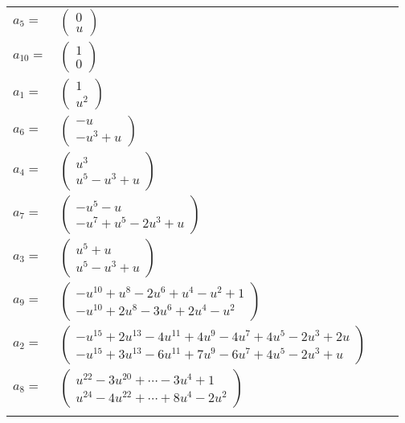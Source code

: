 \documentclass[1p]{elsarticle_modified}
\theoremstyle{definition}
\begin{document}
\begin{tabular}{m{7pt} m{180pt} m{7pt} m{180pt} }
\flushright $a_{5}=$&$\begin{pmatrix}0\\u\end{pmatrix}$ \\
\flushright $a_{10}=$&$\begin{pmatrix}1\\0\end{pmatrix}$ \\
\flushright $a_{1}=$&$\begin{pmatrix}1\\u^2\end{pmatrix}$ \\
\flushright $a_{6}=$&$\begin{pmatrix}- u\\- u^3+u\end{pmatrix}$ \\
\flushright $a_{4}=$&$\begin{pmatrix}u^3\\u^5- u^3+u\end{pmatrix}$ \\
\flushright $a_{7}=$&$\begin{pmatrix}- u^5- u\\- u^7+u^5-2 u^3+u\end{pmatrix}$ \\
\flushright $a_{3}=$&$\begin{pmatrix}u^5+u\\u^5- u^3+u\end{pmatrix}$ \\
\flushright $a_{9}=$&$\begin{pmatrix}- u^{10}+u^8-2 u^6+u^4- u^2+1\\- u^{10}+2 u^8-3 u^6+2 u^4- u^2\end{pmatrix}$ \\
\flushright $a_{2}=$&$\begin{pmatrix}- u^{15}+2 u^{13}-4 u^{11}+4 u^9-4 u^7+4 u^5-2 u^3+2 u\\- u^{15}+3 u^{13}-6 u^{11}+7 u^9-6 u^7+4 u^5-2 u^3+u\end{pmatrix}$ \\
\flushright $a_{8}=$&$\begin{pmatrix}u^{22}-3 u^{20}+\cdots-3 u^4+1\\u^{24}-4 u^{22}+\cdots+8 u^4-2 u^2\end{pmatrix}$\\&\end{tabular}
\end{document}

